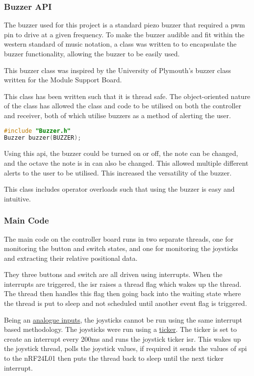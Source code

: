 \documentclass [11pt]{article}
\begin{document}
\subsubsection{Buzzer API}\label{sec:buzzer_api}

The buzzer used for this project is a standard piezo buzzer that required a \gls{pwm} pin to drive at a given frequency. To make the buzzer audible and fit within the western standard of music notation, a class was written to to encapsulate the buzzer functionality, allowing the buzzer to be easily used. 

This buzzer class was inspired by the University of Plymouth's buzzer class written for the Module Support Board. 

This class has been written such that it is thread safe. The object-oriented nature of the class has allowed the class and code to be utilised on both the controller and receiver, both of which utilise buzzers as a method of alerting the user. 

\begin{lstlisting}[language=C++,label=code:buzzer_decleration,caption= Buzzer Class Constructor]
#include "Buzzer.h"
Buzzer buzzer(BUZZER);
\end{lstlisting}

Using this \gls{api}, the buzzer could be turned on or off, the note can be changed, and the octave the note is in can also be changed. This allowed multiple different alerts to the user to be utilised. This increased the versatility of the buzzer. 

This class includes operator overloads such that using the buzzer is easy and intuitive.

\subsubsection{Main Code}

The main code on the controller board runs in two separate threads, one for monitoring the button and switch states, and one for monitoring the joysticks and extracting their relative positional data. 

They three buttons and switch are all driven using interrupts. When the interrupts are triggered, the \gls{isr} raises a thread flag which wakes up the thread. The thread then handles this flag then going back into the waiting state where the thread is put to sleep and not scheduled until another event flag is triggered. 

Being an \href{https://os.mbed.com/docs/mbed-os/v6.15/apis/i-o-apis.html}{analogue inputs}, the joysticks cannot be run using the same interrupt based methodology. The joysticks were run using a \href{https://os.mbed.com/docs/mbed-os/v6.15/apis/ticker.html}{ticker}. The ticker is set to create an interrupt every 200ms and runs the joystick ticker \gls{isr}. This wakes up the joystick thread, polls the joystick values, if required it sends the values of \gls{spi} to the nRF24L01 then puts the thread back to sleep until the next ticker interrupt.
\end{document}
